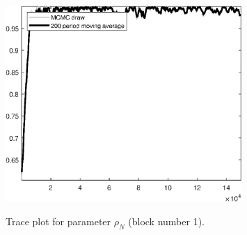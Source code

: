 \begin{figure}[H]
\centering
  \includegraphics[width=0.8\textwidth]{BRS_sectoral_wo_gmf/graphs/TracePlot_rho_N_blck_1}\\
    \caption{Trace plot for parameter ${\rho_N}$ (block number 1).}
\end{figure}

